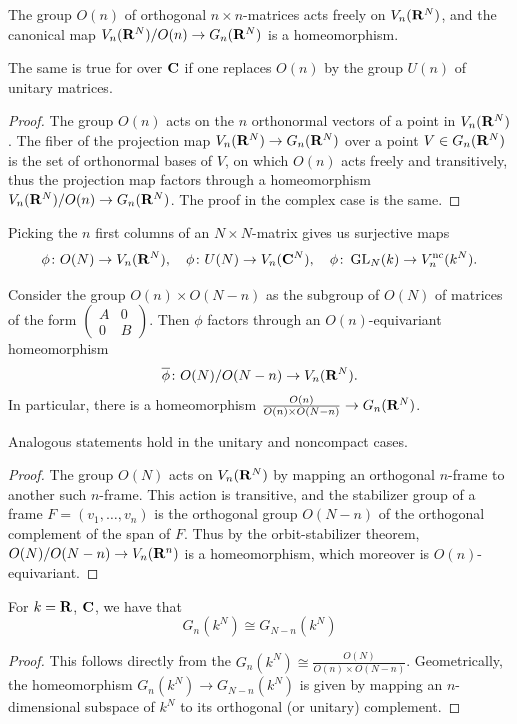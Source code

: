 \documentclass[a4paper,openany]{scrbook}
\begin{document}
\begin{lemma}
The group $O(n)$ of orthogonal $n\times n$-matrices acts freely on $V_n(\mathbf R^N)$, and the canonical map $V_n(\mathbf R^N)/O(n) \to G_n(\mathbf R^N)$ is a homeomorphism. 

The same is true for over $\mathbf C$ if one replaces $O(n)$ by the group $U(n)$ of unitary matrices.
\end{lemma}
\begin{proof}
The group $O(n)$ acts on the $n$ orthonormal vectors of a point in $V_n(\mathbf R^N)$. The fiber of the projection map $V_n(\mathbf R^N) \to G_n(\mathbf R^N)$ over a point $V \in G_n(\mathbf R^N)$ is the set of orthonormal bases of $V$, on which $O(n)$ acts freely and transitively, thus the projection map factors through a homeomorphism $V_n(\mathbf R^N)/O(n) \to G_n(\mathbf R^N)$. The proof in the complex case is the same.
\end{proof}

Picking the $n$ first columns of an $N\times N$-matrix gives us surjective maps
\[
\phi\colon O(N) \to V_n(\mathbf R^N), \quad \phi\colon U(N) \to V_n(\mathbf C^N), \quad \phi\colon \operatorname{GL}_N(k) \to V_n^{\operatorname{nc}}(k^N).
\]

\begin{lemma}\label{lemma:grassstiefelashomogeneousspaces}
Consider the group $O(n) \times O(N-n)$ as the subgroup of $O(N)$ of matrices of the form $\left(\begin{smallmatrix} A & 0\\ 0 & B\end{smallmatrix}\right)$. Then $\phi$ factors through an $O(n)$-equivariant homeomorphism
\[
\overline\phi\colon O(N)/O(N-n) \to V_n(\mathbf R^N).
\]
In particular, there is a homeomorphism $\frac{O(n)}{O(n)\times O(N-n)} \to G_n(\mathbf R^N)$.

Analogous statements hold in the unitary and noncompact cases.
\end{lemma}
\begin{proof}
The group $O(N)$ acts on $V_n(\mathbf R^N)$ by mapping an orthogonal $n$-frame to another such $n$-frame. This action is transitive, and the stabilizer group of a frame $F=(v_1,\dots,v_n)$ is the orthogonal group $O(N-n)$ of the orthogonal complement of the span of $F$. Thus by the orbit-stabilizer theorem, $O(N)/O(N-n) \to V_n(\mathbf R^n)$ is a homeomorphism, which moreover is $O(n)$-equivariant.
\end{proof}

\begin{corollary}
For $k=\mathbf R$, $\mathbf C$, we have that
\[
G_n(k^N) \cong G_{N-n}(k^N)
\]
\end{corollary}
\begin{proof}
This follows directly from the $G_n(k^N) \cong \frac{O(N)}{O(n) \times O(N-n)}$. Geometrically, the homeomorphism $G_n(k^N) \to G_{N-n}(k^N)$ is given by mapping an $n$-dimensional subspace of $k^N$ to its orthogonal (or unitary) complement.
\end{proof}
\end{document}
